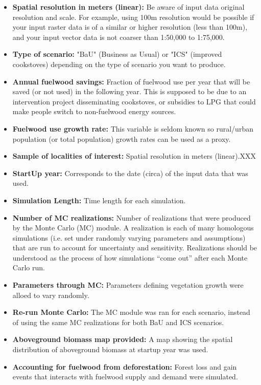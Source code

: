 \documentclass[english,a4paper,11pt,twoside]{report}
\begin{document}
\begin{itemize}
	\item \textbf{Spatial resolution in meters (linear):} Be aware of input data original resolution and scale. For example, using 100m resolution would be possible if your input raster data is of a similar or higher resolution (less than 100m), and your input vector data is not coarser than 1:50,000 to 1:75,000.
	\item \textbf{Type of scenario:} "BaU" (Business as Usual) or "ICS" (improved cookstoves) depending on the type of scenario you want to produce.
	\item \textbf{Annual fuelwood savings:} Fraction of fuelwood use per year that will be saved (or not used) in the following year. This is supposed to be due to an intervention project disseminating cookstoves, or subsidies to LPG that could make people switch to non-fuelwood energy sources.
	\item \textbf{Fuelwood use growth rate:} This variable is seldom known so rural/urban population (or total population) growth rates can be used as a proxy.
	\item \textbf{Sample of localities of interest:} Spatial resolution in meters (linear).XXX 
	\item \textbf{StartUp year:} Corresponds to the date (circa) of the input data that was used.
	\item \textbf{Simulation Length:} Time length for each simulation.
	\item \textbf{Number of MC realizations:} Number of realizations that were produced by the Monte Carlo (MC) module. A realization is each of many homologous simulations (i.e. set under randomly varying parameters and assumptions) that are run to account for uncertainty and sensitivity. Realizations should be understood as the process of how simulations “come out” after each Monte Carlo run. 
	\item \textbf{Parameters through MC:} Parameters defining vegetation growth were alloed to vary randomly.
	\item \textbf{Re-run Monte Carlo:} The MC module was ran for each scenario, instead of using the same MC realizations for both BaU and ICS scenarios.
	\item \textbf{Aboveground biomass map provided:} A map showing the spatial distribution of aboveground biomass at startup year was used.
	\item \textbf{Accounting for fuelwood from deforestation:} Forest loss and gain events that interacts with fuelwood supply and demand were simulated.\bigskip
\end{itemize}
\end{document}
